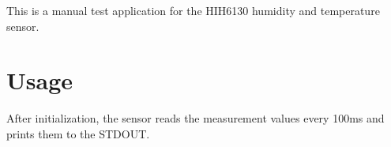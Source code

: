 This is a manual test application for the H\+I\+H6130 humidity and temperature sensor.

\section*{Usage}

After initialization, the sensor reads the measurement values every 100ms and prints them to the S\+T\+D\+O\+UT. 